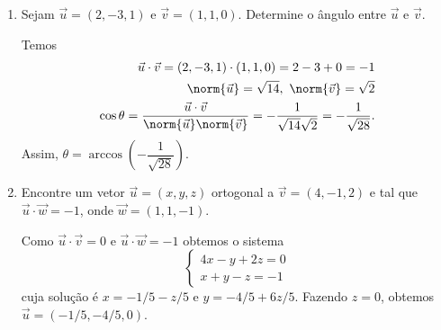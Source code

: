 \begin{exemplos}
  \begin{enumerate}
    \item Sejam $\vec{u} = (2, -3, 1)$ e $\vec{v} = (1,1, 0)$. Determine o \^angulo entre $\vec{u}$ e $\vec{v}$.
    \begin{solucao}
      Temos
      \begin{align*}
        \vec{u}\cdot\vec{v} = (2, -3, 1)\cdot(1,1,0) = 2 - 3 + 0 = -1\\
        \norm{\vec{u}} = \sqrt{14},\ \norm{\vec{v}} = \sqrt{2}\\
        \cos\theta = \frac{\vec{u}\cdot\vec{v}}{\norm{\vec{u}}\norm{\vec{v}}} = -\dfrac{1}{\sqrt{14}\sqrt{2}} = -\dfrac{1}{\sqrt{28}}.
      \end{align*}
      Assim, $\theta = \arccos\left(-\dfrac{1}{\sqrt{28}}\right)$.
    \end{solucao}
    \item Encontre um vetor $\vec{u} = (x, y, z)$ ortogonal a $\vec{v} = (4, -1, 2)$ e tal que $\vec{u}\cdot\vec{w} = -1$, onde $\vec{w} = (1,1,-1)$.
    \begin{solucao}
      Como $\vec{u}\cdot\vec{v} = 0$ e $\vec{u}\cdot\vec{w} = -1$ obtemos o sistema
      \[
        \begin{cases}
          4x - y + 2z = 0\\
          x + y - z = -1
        \end{cases}
      \]
      cuja solu\c{c}\~ao \'e $x = -1/5 - z/5$ e $y = -4/5 + 6z/5$. Fazendo $z = 0$, obtemos $\vec{u} = (-1/5, -4/5, 0)$.
    \end{solucao}
  \end{enumerate}
\end{exemplos}

